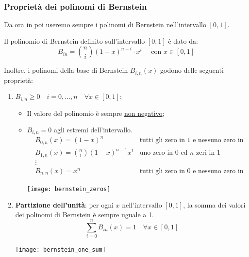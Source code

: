 \documentclass{article}
\begin{document}
\subsubsection{Proprietà dei polinomi di Bernstein}
Da ora in poi useremo sempre i polinomi di Bernstein nell'intervallo $[0,1]$.
\begin{definition}
    Il polinomio di Bernstein definito sull'intervallo $[0,1]$ è dato da:
    $$B_{in}=\binom{n}{i}(1-x)^{n-i}\cdot x^{i}\quad \text{ con }x\in[0,1]$$
\end{definition}
Inoltre, i polinomi della base di Bernstein $B_{i,n}(x)$ godono delle seguenti
proprietà:
\begin{enumerate}
    \item $B_{i,n}\geq0\quad i=0,\ldots,n\quad \forall x\in[0,1]$;
        \begin{itemize}
            \item Il valore del polinomio è sempre \underline{non negativo};
            \item $B_{i,n}=0$ agli estremi dell'intervallo.
                \begin{equation*}
                   \begin{aligned}
                       & B_{0,n}(x)=(1-x)^n &\text{tutti gli zero in 1 e
                       nessuno zero in 0}\\
                       & B_{1,n}(x)=\binom{n}{1}(1-x)^{n-1}x^1 & \text{uno
                       zero in 0 ed $n$ zeri in 1}\\
                       & \vdots \\
                       & B_{n,n}(x)=x^n & \text{tutti gli zero in 0 e
                       nessuno zero in 1}
                   \end{aligned} 
                \end{equation*}
                \begin{center}
                    \texttt{[image: bernstein\_zeros]}
                \end{center}
        \end{itemize}
    \item \textbf{Partizione dell'unità}:
        per ogni $x$ nell'intervallo $[0,1]$, la somma dei valori dei
        polinomi di Bernstein è sempre uguale a 1.
        $$\displaystyle\sum_{i=0}^{n}B_{in}(x)=1\quad \forall x\in[0,1]$$
        \begin{center}
            \texttt{[image: bernstein\_one\_sum]}
        \end{center}

\end{enumerate}
\end{document}

